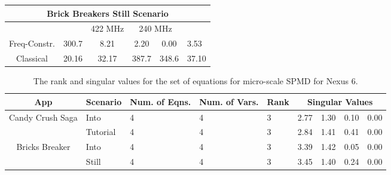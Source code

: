 \begin{table*}[tp]
{\begin{tabular}{|c|c|c|c|c|p{5.4mm}|}
    \multicolumn{6}{|c|}{\textbf{Brick Breakers Still Scenario}} \\
        \hline
        &  & 422 MHz & \multicolumn{2}{c|}{240 MHz} & \\
        \hline
        Freq-Constr. & 300.7 & 8.21 & 2.20 & 0.00 & 3.53 \\
        \hline
        Classical & 20.16 & 32.17 & 387.7 & 348.6 & 37.10 \\
        \hline

\end{tabular}
}
\label{tab:nexus6micro}
\vspace{-0.1in}
\end{table*}

\begin{table*}[tp]
{\footnotesize
    \centering
    \caption{The rank and singular values for the set of equations for micro-scale SPMD for Nexus 6.}
    \vspace{-0.1in}
    \begin{tabular}{|c|p{9mm}|p{4.5mm}|p{4.5mm}|p{4mm}|p{4mm}|p{4mm}|p{4mm}|p{4mm}|}
    \hline
        App & Scenario & Num. of Eqns. & Num. of Vars. & Rank &  \multicolumn{4}{c|}{Singular Values} \\
        \hline
        \multirow{2}{13mm}{Candy Crush Saga} & Into & 4 & 4 & 3 & 2.77  & 1.30  & 0.10  & 0.00 \\
        \cline{2-9}
	     & Tutorial & 4 & 4 & 3 & 2.84  & 1.41  & 0.41  & 0.00 \\
	     \hline
         \multirow{2}{13mm}{Bricks Breaker} & Into & 4 & 4 & 3 & 3.39  & 1.42  & 0.05  & 0.00 \\
         \cline{2-9}
         & Still & 4 & 4 & 3 & 3.45  & 1.40  & 0.24  & 0.00 \\
         \hline
    \end{tabular}
    \label{tab:micro-rank_nexus6}
    \vspace{-0.1in}
}
\end{table*}

